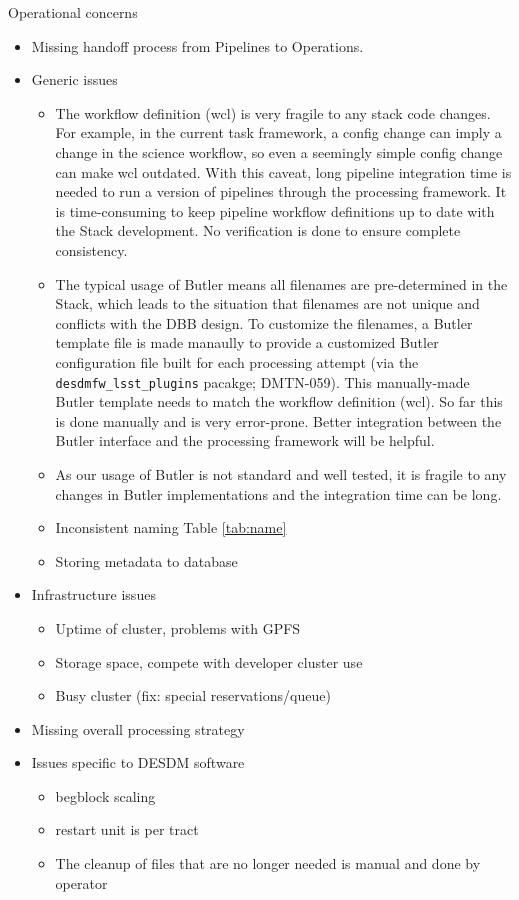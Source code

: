 \documentclass[DM,lsstdraft,STR,toc]{lsstdoc}
\begin{document}
Operational concerns
\begin{itemize}
  \item Missing handoff process from Pipelines to Operations.
  \item Generic issues
  \begin{itemize}
    \item The workflow definition (wcl) is very fragile to any stack
	  code changes. For example, in the current task framework,
	  a config change can imply a change in the science workflow,
	  so even a seemingly simple config change can make wcl
	  outdated. With this caveat, long pipeline integration
	  time is needed to run a version of pipelines through the
	  processing framework. It is time-consuming to keep pipeline
	  workflow definitions up to date with the Stack development.
          No verification is done to ensure complete consistency.
    \item The typical usage of Butler means all filenames are
	  pre-determined in the Stack, which leads to the situation
	  that filenames are not unique and conflicts with the DBB
	  design. To customize the filenames, a Butler template
	  file is made manaully to provide a customized Butler
	  configuration file built for each processing attempt (via
	  the \texttt{desdmfw{\_}lsst{\_}plugins} pacakge; DMTN-059).
	  This manually-made Butler template needs to match the
	  workflow definition (wcl). So far this is done manually
	  and is very error-prone.  Better integration between the
	  Butler interface and the processing framework will be helpful.
    \item As our usage of Butler is not standard and well tested,
	  it is fragile to any changes in Butler implementations
	  and the integration time can be long.
    \item Inconsistent naming
          Table \ref{tab:name}
          
    \item Storing metadata to database
  \end{itemize}
  \item Infrastructure issues
  \begin{itemize}
    \item Uptime of cluster, problems with GPFS
    \item Storage space, compete with developer cluster use
    \item Busy cluster (fix: special reservations/queue)
  \end{itemize}
  \item Missing overall processing strategy
  \item Issues specific to DESDM software
  \begin{itemize}
    \item begblock scaling
    \item restart unit is per tract
    \item The cleanup of files that are no longer needed is manual and done by operator
  \end{itemize}
\end{itemize}
\end{document}
